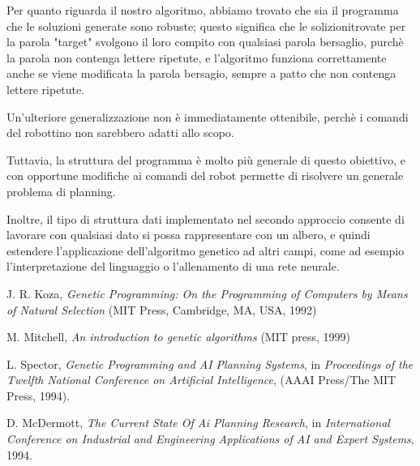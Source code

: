 \documentclass[paper=a4, fontsize=11pt]{scrartcl}
\numberwithin{equation}{section}		%
\numberwithin{figure}{section}			%
\numberwithin{table}{section}				%
\begin{document}
Per quanto riguarda il nostro algoritmo, abbiamo trovato che sia il programma che le soluzioni generate sono robuste; questo significa che le solizionitrovate per la parola "target" svolgono il loro compito con qualsiasi parola bersaglio, purchè la parola non contenga lettere ripetute, e l'algoritmo funziona correttamente anche se viene modificata la parola bersagio, sempre a patto che non contenga lettere ripetute.

Un'ulteriore generalizzazione non è immediatamente ottenibile, perchè i comandi del robottino non sarebbero adatti allo scopo.

Tuttavia, la struttura del programma è molto più generale di questo obiettivo, e con opportune modifiche ai comandi del robot permette di risolvere un generale problema di planning.

Inoltre, il tipo di struttura dati implementato nel secondo approccio consente di lavorare con qualsiasi dato si possa rappresentare con un albero, e quindi estendere l'applicazione dell'algoritmo genetico ad altri campi, come ad esempio l'interpretazione del linguaggio o l'allenamento di una rete neurale.




\begin{thebibliography}{55}
  J. R. Koza, \emph{Genetic Programming: On the Programming of Computers by Means of Natural Selection} (MIT Press, Cambridge, MA, USA, 1992)

 M. Mitchell, \emph{An introduction to genetic algorithms} (MIT press, 1999)

 L. Spector, \emph{Genetic Programming and AI Planning Systems}, in \emph{Proceedings of the Twelfth National Conference on Artificial
Intelligence},  (AAAI Press/The MIT Press, 1994).

 D. McDermott, \emph{The Current State Of Ai Planning Research}, in \emph{International Conference on Industrial and Engineering Applications of AI and Expert Systems}, 1994.


\end{thebibliography}

\end{document}
